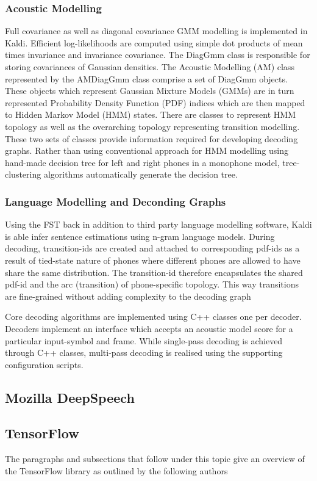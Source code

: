 \subsubsection{Acoustic Modelling}
Full covariance as well as diagonal covariance GMM modelling is implemented in Kaldi. Efficient log-likelihoods are computed using simple dot products of mean times invariance and invariance covariance.  The DiagGmm class is responsible for storing covariances of Gaussian densities. The Acoustic Modelling (AM) class represented by the AMDiagGmm class comprise a set of DiagGmm objects.  These objects which represent Gaussian Mixture Models (GMMs) are in turn represented Probability Density Function (PDF) indices which are then mapped to Hidden Markov Model (HMM) states. There are classes to represent HMM topology as well as the overarching topology representing transition modelling. These two sets of classes provide information required for developing decoding graphs.  Rather than using conventional approach for HMM modelling using hand-made decision tree for left and right phones in a monophone model, tree-clustering algorithms automatically generate the decision tree.

\subsubsection{Language Modelling and Deconding Graphs}
Using the FST back in addition to third party language modelling software, Kaldi is able infer sentence estimations using n-gram language models. During decoding, transition-ids are created and attached to corresponding pdf-ids as a result of tied-state nature of phones where different phones are allowed to have share the same distribution.  The transition-id therefore encapsulates the shared pdf-id and the arc (transition) of phone-specific topology. This way transitions are fine-grained without adding complexity to the decoding graph

Core decoding algorithms are implemented using C++ classes one per decoder.  Decoders implement an interface which accepts an acoustic model score for a particular input-symbol and frame.  While single-pass decoding is achieved through C++ classes, multi-pass decoding is realised using the supporting configuration scripts.
\subsection{Mozilla DeepSpeech}

\subsection{TensorFlow}
The paragraphs and subsections that follow under this topic give an overview of the TensorFlow library as outlined by the following authors \cite{goldsborough2016tour,abadi2016tensorflow,abadi2017computational}


